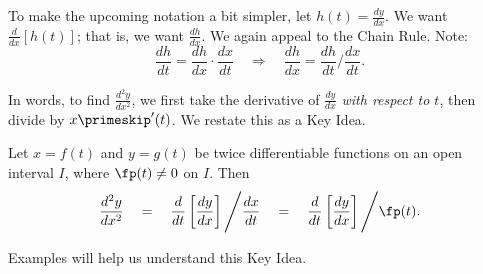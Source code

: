 To make the upcoming notation a bit simpler, let $h(t) = \frac{dy}{dx}$. We want $\frac{d}{dx}[h(t)]$; that is, we want $\frac{dh}{dx}$. We again appeal to the Chain Rule. Note:
$$\frac{dh}{dt} = \frac{dh}{dx}\cdot\frac{dx}{dt} \quad \Rightarrow \quad \frac{dh}{dx} = \frac{dh}{dt}\Bigg/\frac{dx}{dt}.$$

In words, to find $\frac{d^2y}{dx^2}$, we first take the derivative of $\frac{dy}{dx}$ \textit{with respect to $t$}, then divide by $x\primeskip'(t)$. We restate this as a Key Idea.

{Let $x=f(t)$ and $y=g(t)$ be twice differentiable functions on an open interval $I$, where $\fp(t)\neq 0$ on $I$. Then 
$$\frac{d^2y}{dx^2}\quad = \quad\frac{d}{dt}\left[\frac{dy}{dx}\right]\Bigg/\frac{dx}{dt} \quad=\quad \frac{d}{dt}\left[\frac{dy}{dx}\right]\Bigg/\fp(t).$$ 
}

Examples will help us understand this Key Idea.\\

